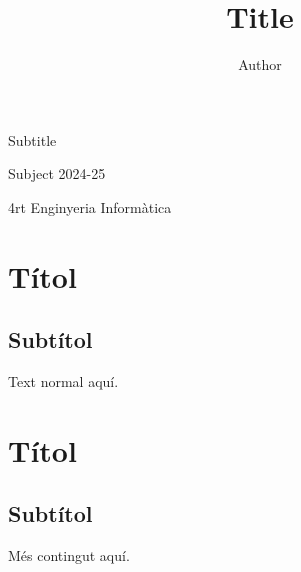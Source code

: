 \documentclass[a4paper,12pt]{article}
\title{Title}
\author{Author}
\newcommand{\titlesize}{36pt}
\newcommand{\subtitlesize}{24pt}
\newcommand{\thesubtitle}{Subtitle}
\newcommand{\thesubject}{Subject}
\newcommand{\thedegree}{4rt Enginyeria Informàtica}
\newcommand{\theperiod}{2024-25}
\begin{document}
\thispagestyle{empty}
\begin{center}

\large{\theauthor}

\vspace{6.5cm}

{\fontsize{\titlesize}{\titlesize}\selectfont \thetitle} %

\vspace{1em} %
{\fontsize{\subtitlesize}{\subtitlesize}\selectfont \thesubtitle} %

\vfill %

\large{\thesubject} \large{\theperiod}

\large{\thedegree}

\end{center}

\newpage

\tableofcontents
\newpage

\section{Títol}
\subsection{Subtítol}
Text normal aquí.

\newpage

\section{Títol}
\subsection{Subtítol}
Més contingut aquí.
\end{document}
